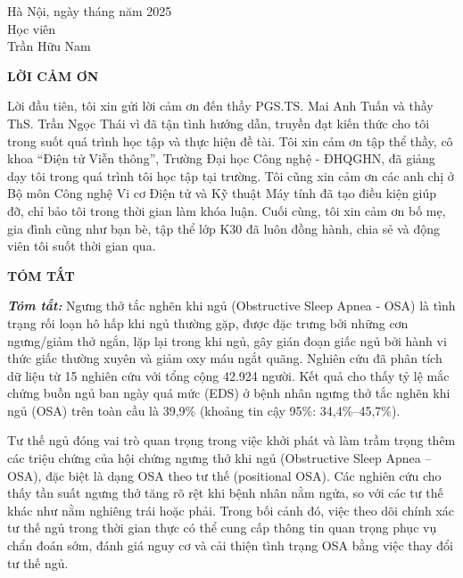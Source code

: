 \begin{flushright}
	\begin{varwidth}{\linewidth}\centering
		Hà Nội, ngày \space\space\space\space tháng  \space\space\space\space năm 2025\\
		Học viên\\[2cm]
		Trần Hữu Nam
	\end{varwidth}
\end{flushright}

\newpage

\begin{center}
    \textbf{LỜI CẢM ƠN}
\end{center}

Lời đầu tiên, tôi xin gửi lời cảm ơn đến thầy PGS.TS. Mai Anh Tuấn và thầy ThS. Trần Ngọc Thái vì đã tận tình hướng dẫn, truyền đạt kiến thức cho tôi trong suốt quá trình học tập và thực hiện đề tài. 
Tôi xin cảm ơn tập thể thầy, cô khoa “Điện tử Viễn thông”,  Trường Đại học Công nghệ - ĐHQGHN, đã giảng dạy tôi trong quá trình tôi học tập tại trường. Tôi cũng xin cảm ơn các anh chị ở Bộ môn Công nghệ Vi cơ Điện tử và Kỹ thuật Máy tính đã tạo điều kiện giúp đỡ, chỉ bảo tôi trong thời gian làm khóa luận. 
Cuối cùng, tôi xin cảm ơn bố mẹ, gia đình cũng như bạn bè, tập thể lớp K30 đã luôn đồng hành, chia sẻ và động viên tôi suốt thời gian qua.


\newpage
{}
\begin{center}
    \textbf{TÓM TẮT}
\end{center}
\textit{\textbf{Tóm tắt: }} 
Ngưng thở tắc nghẽn khi ngủ (Obstructive Sleep Apnea - OSA) là tình trạng rối loạn hô hấp khi ngủ thường gặp, được đặc trưng bởi những cơn ngưng/giảm thở ngắn, lặp lại trong khi ngủ, gây gián đoạn giấc ngủ bởi hành vi thức giấc thường xuyên và giảm oxy máu ngắt quãng\cite{Epstein2009}. Nghiên cứu\cite{Salari2025} đã phân tích dữ liệu từ 15 nghiên cứu với tổng cộng 42.924 người. Kết quả cho thấy tỷ lệ mắc chứng buồn ngủ ban ngày quá mức (EDS) ở bệnh nhân ngưng thở tắc nghẽn khi ngủ (OSA) trên toàn cầu là 39,9\% (khoảng tin cậy 95\%: 34,4\%–45,7\%).

Tư thế ngủ đóng vai trò quan trọng trong việc khởi phát và làm trầm trọng thêm các 
triệu chứng của hội chứng ngưng thở khi ngủ (Obstructive Sleep Apnea – OSA), 
đặc biệt là dạng OSA theo tư thế (positional OSA). 
Các nghiên cứu cho thấy tần suất ngưng thở tăng rõ rệt khi bệnh nhân nằm ngửa, 
so với các tư thế khác như nằm nghiêng trái hoặc phải. 
Trong bối cảnh đó, việc theo dõi chính xác tư thế ngủ trong thời gian thực có thể cung cấp thông tin quan trọng phục vụ chẩn đoán sớm, 
đánh giá nguy cơ và cải thiện tình trạng OSA bằng việc thay đổi tư thế ngủ.

